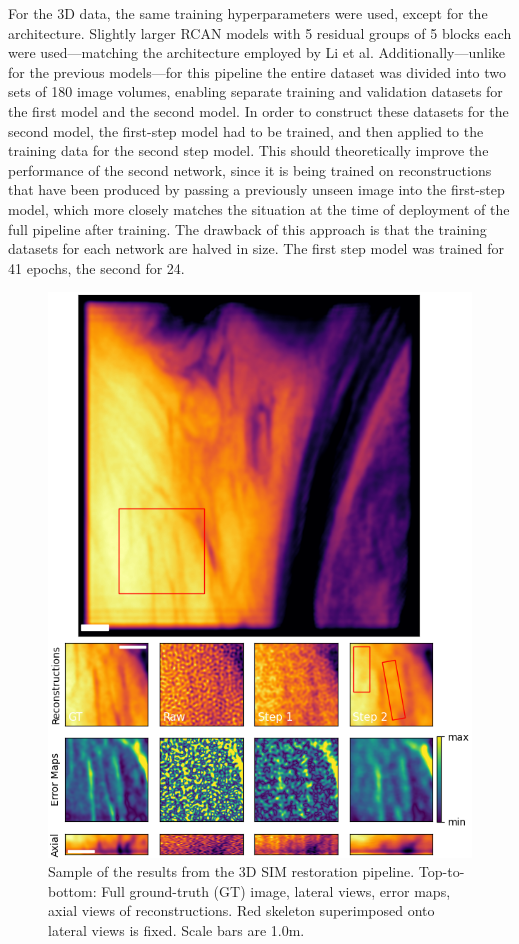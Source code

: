 \documentclass[12pt]{article}
\begin{document}
For the 3D data, the same training hyperparameters were used, except for the architecture.
Slightly larger RCAN models with 5 residual groups of 5 blocks each were used---matching the architecture employed by Li et al.
Additionally---unlike for the previous models---for this pipeline the entire dataset was divided into two sets of 180 image volumes,
enabling separate training and validation datasets for the first model and the second model.
In order to construct these datasets for the second model, the first-step model had to be trained,
and then applied to the training data for the second step model.
This should theoretically improve the performance of the second network,
since it is being trained on reconstructions that have been produced by passing a previously unseen image into the first-step model,
which more closely matches the situation at the time of deployment of the full pipeline after training.
The drawback of this approach is that the training datasets for each network are halved in size.
The first step model was trained for 41 epochs, the second for 24.

\begin{figure}[hbtp]
    \includegraphics[scale=1.05, center]{figures/vh_error.png}
    \caption{Sample of the results from the 3D SIM restoration pipeline.
    Top-to-bottom: Full ground-truth (GT) image, lateral views, error maps, axial views of reconstructions.
    Red skeleton superimposed onto lateral views is fixed. Scale bars are 1.0\textmu m.}
    \label{fig:vh_samples_error}
\end{figure}
\end{document}
